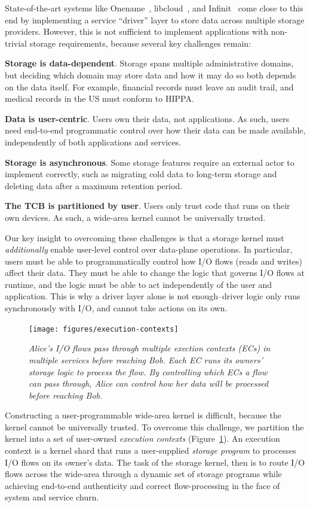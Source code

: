 State-of-the-art systems like Onename~\cite{onename},
libcloud~\cite{libcloud}, and Infinit~\cite{infinite} come close to this
end by implementing a service ``driver'' layer to
store data across multiple storage providers.  However, this is not
sufficient to implement applications with non-trivial storage requirements,
because several key challenges remain:

\textbf{Storage is data-dependent}. Storage spans multiple
administrative domains, but deciding which domain may store data and how it may
do so both depends on the data itself. For example, financial records must leave
an audit trail, and medical records in the US must conform to HIPPA.

\textbf{Data is user-centric}. Users own their data, not applications.
As such, users need end-to-end programmatic control over how their data
can be made available, independently of both applications and services.

\textbf{Storage is asynchronous}. Some storage features require an external
actor to implement correctly, such as migrating cold data to long-term storage
and deleting data after a maximum retention period.

\textbf{The TCB is partitioned by user}.  Users only trust code that runs on their own
devices.  As such, a wide-area kernel cannot be universally trusted.

Our key insight to overcoming these challenges is that a storage kernel
must \textit{additionally} enable user-level control over data-plane operations.
In particular, users must be able to programmatically
control how I/O flows (reads and writes) affect their data.  They must be able to change the
logic that governs I/O flows at runtime, and the logic must be able to
act independently of the user and application.  This is why a driver layer alone is
not enough--driver logic only runs synchronously with I/O, and cannot take
actions on its own.

\begin{figure}[t!]
\centering
\texttt{[image: figures/execution-contexts]}
\caption{\it Alice's I/O flows pass through
   multiple exection contexts (ECs) in multiple services before reaching Bob.  Each
   EC runs its owners' storage logic to process the flow.  By
   controlling which ECs a flow can pass through, Alice can control how her data
   will be processed before reaching Bob.}
\label{fig:execution-contexts}
\end{figure}

Constructing a user-programmable wide-area kernel is difficult, because the kernel cannot be
universally trusted.  To overcome this challenge, we partition the kernel into a
set of user-owned \textit{execution contexts}
(Figure~\ref{fig:execution-contexts}).  An execution context is a
kernel shard that runs a user-supplied \textit{storage program} to processes I/O
flows on its owner's data.  The task of the storage kernel, then is to 
route I/O flows across the wide-area 
through a dynamic set of storage programs
while achieving end-to-end authenticity and correct flow-processing in the face
of system and service churn.


